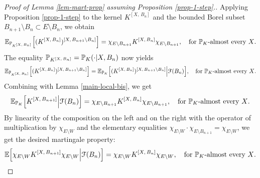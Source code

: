 \documentclass[12pt]{paper}
\numberwithin{theorem}{section}
\numberwithin{figure}{section}
\numberwithin{equation}{section}
\begin{document}
\begin{proof}[Proof of Lemma \ref{lem-mart-prop} assuming Proposition \ref{prop-1-step}.]
Applying Proposition \ref{prop-1-step} to the kernel $K^{[X, \, B_n]}$  and the bounded Borel subset $B_{n+1}\setminus B_n \subset E\setminus B_n$, we obtain
\begin{align*}
\mathbb{E}_{\mathbb{P}_{K^{[X, \, B_n]}}}\Big[  (K^{[X,\, B_n]})^{[X, \,   B_{n+1}\setminus  B_n]}  \Big] =\chi_{E\setminus B_{n+1}} K^{[X,\, B_n]} \chi_{E\setminus B_{n+1}}, \quad \text{for $\mathbb{P}_{K}$-almost every $X$}.
\end{align*}
The equality  $\mathbb{P}_{K^{[X, \, B_n]}} = \mathbb{P}_{K} (\cdot |X,  B_n)$ now yields
\begin{align*}
 \mathbb{E}_{\mathbb{P}_{K^{[X, \, B_n]}}}\Big[  (K^{[X,\, B_n]})^{[X, \,   B_{n+1}\setminus  B_n]}  \Big] = \mathbb{E}_{\mathbb{P}_K}\Big[    (K^{[X,\, B_n]})^{[X, \,   B_{n+1}\setminus  B_n]}   \Big| \mathcal{F}(B_n)\Big],\quad \text{for $\mathbb{P}_K$-almost every $X$.}
\end{align*}
Combining with Lemma  \ref{main-local-bis}, we get
\begin{align*}
  \mathbb{E}_{\mathbb{P}_K}\Big[   K^{[X, \, B_{n+1}]} \Big| \mathcal{F}(B_n) \Big]  = \chi_{E\setminus B_{n+1}} K^{[X, \, B_n]} \chi_{E\setminus B_{n+1}}, \quad \text{for $\mathbb{P}_K$-almost every $X$.}
\end{align*}
By linearity of the composition on the left and on the right with the operator of  multiplication by $\chi_{E\setminus W}$ and the elementary equalities $\chi_{E\setminus W} \cdot  \chi_{E\setminus B_{n+1}}  =  \chi_{E\setminus W}$,  we get the desired martingale property:
\begin{align*}
   \mathbb{E}\Big[  \chi_{E\setminus W} K^{[X, \, B_{n+1}]}  \chi_{E\setminus W} \Big| \mathcal{F}( B_n)\Big]   =  \chi_{E\setminus W}  K^{[X, \, B_n]} \chi_{E\setminus W}, \quad \text{for $\mathbb{P}_K$-almost every $X$.}
\end{align*}
\end{proof}
\end{document}
